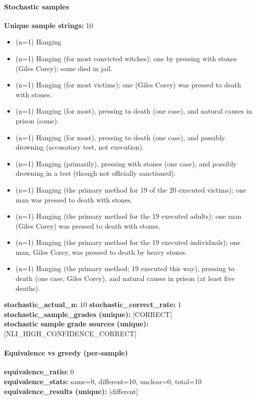 \documentclass[11pt]{article}
\begin{document}
\paragraph{Stochastic samples}
\textbf{Unique sample strings:} 10\\
\small
\begin{itemize}
\item (n=1) Hanging
\item (n=1) Hanging (for most convicted witches); one by pressing with stones (Giles Corey); some died in jail.
\item (n=1) Hanging (for most victims); one (Giles Corey) was pressed to death with stones.
\item (n=1) Hanging (for most), pressing to death (one case), and natural causes in prison (some).
\item (n=1) Hanging (for most), pressing to death (one case), and possibly drowning (accusatory test, not execution).
\item (n=1) Hanging (primarily), pressing with stones (one case), and possibly drowning in a test (though not officially sanctioned).
\item (n=1) Hanging (the primary method for 19 of the 20 executed victims); one man was pressed to death with stones.
\item (n=1) Hanging (the primary method for the 19 executed adults); one man (Giles Corey) was pressed to death with stones.
\item (n=1) Hanging (the primary method for the 19 executed individuals); one man, Giles Corey, was pressed to death by heavy stones.
\item (n=1) Hanging (the primary method; 19 executed this way), pressing to death (one case, Giles Corey), and natural causes in prison (at least five deaths).
\end{itemize}
\normalsize
\textbf{stochastic\_actual\_n:} 10 \quad \textbf{stochastic\_correct\_rate:} 1\\
\textbf{stochastic\_sample\_grades (unique):} [CORRECT]\\
\textbf{stochastic sample grade sources (unique):} [NLI\_HIGH\_CONFIDENCE\_CORRECT]\\
\paragraph{Equivalence vs greedy (per-sample)}
\textbf{equivalence\_ratio:} 0\\
\textbf{equivalence\_stats:} same=0, different=10, unclear=0, total=10\\
\textbf{equivalence\_results (unique):} [different]\\
\end{document}
